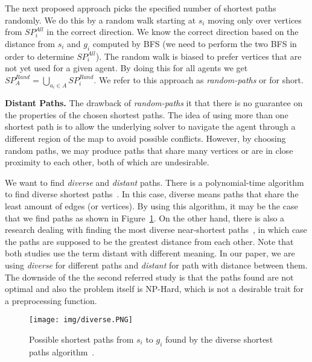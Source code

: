 The next proposed approach picks the specified number of shortest paths randomly. We do this by a random walk starting at $s_i$ moving only over vertices from $SP_i^{\mathit{All}}$ in the correct direction. We know the correct direction based on the distance from $s_i$ and $g_i$ computed by BFS (we need to perform the two BFS in order to determine $SP_i^{\mathit{All}}$). The random walk is biased to prefer vertices that are not yet used for a given agent. By doing this for all agents we get $SP_A^{Rand} = \bigcup_{a_i \in A} SP_i^{Rand}$. We refer to this approach as \emph{random-paths} or \psr{} for short.




%
\textbf{Distant Paths.}
The drawback of \emph{random-paths} it that there is no guarantee on the properties of the chosen shortest paths. The idea of using more than one shortest path is to allow the underlying solver to navigate the agent through a different region of the map to avoid possible conflicts. However, by choosing random paths, we may produce paths that share many vertices or are in close proximity to each other, both of which are undesirable.

We want to find \emph{diverse} and \emph{distant} paths. There is a polynomial-time algorithm to find diverse shortest paths~\cite{diverse}. In this case, diverse means paths that share the least amount of edges (or vertices). By using this algorithm, it may be the case that we find paths as shown in Figure~\ref{fig:diverse}. On the other hand, there is also a research dealing with finding the most diverse near-shortest paths~\cite{distant}, in which case the paths are supposed to be the greatest distance from each other. Note that both studies use the term distant with different meaning. In our paper, we are using \emph{diverse} for different paths and \emph{distant} for path with distance between them. The downside of the the second referred study is that the paths found are not optimal and also the problem itself is NP-Hard, which is not a desirable trait for a preprocessing function.

\begin{figure}[hb]
\centering
\texttt{[image: img/diverse.PNG]}
\caption{Possible shortest paths from $s_i$ to $g_i$ found by the diverse shortest paths algorithm~\cite{diverse}.}
\label{fig:diverse}
\end{figure}



